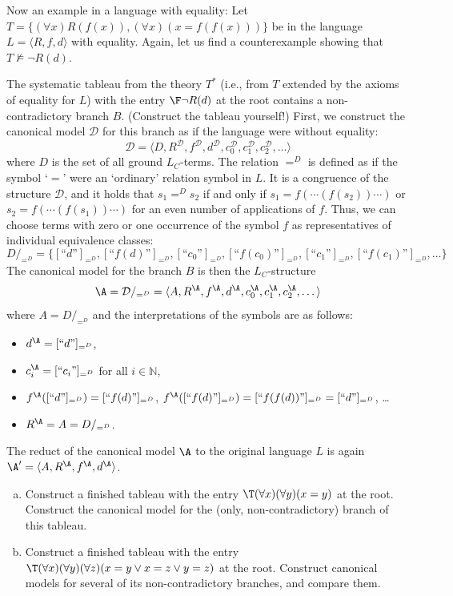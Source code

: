 \begin{example}
    Now an example in a language with equality: Let $T=\{(\forall x)R(f(x)),(\forall x)(x=f(f(x)))\}$ be in the language $L=\langle R,f,d \rangle$ with equality. Again, let us find a counterexample showing that $T\not\models\neg R(d)$. 

    The systematic tableau from the theory $T^*$ (i.e., from $T$ extended by the axioms of equality for $L$) with the entry $\F\neg R(d)$ at the root contains a non-contradictory branch $B$. (Construct the tableau yourself!) First, we construct the canonical model $\mathcal D$ for this branch as if the language were without equality:
    $$
    \mathcal D=\langle D,R^\mathcal D,f^\mathcal D,d^\mathcal D,c_0^\mathcal D,c_1^\mathcal D,c_2^\mathcal D,\dots\rangle
    $$
    where $D$ is the set of all ground $L_C$-terms. The relation $=^D$ is defined as if the symbol `$=$' were an `ordinary' relation symbol in $L$. It is a congruence of the structure $\mathcal D$, and it holds that $s_1=^D s_2$ if and only if $s_1=f(\cdots (f(s_2))\cdots)$ or $s_2=f(\cdots (f(s_1))\cdots)$ for an even number of applications of $f$. Thus, we can choose terms with zero or one occurrence of the symbol $f$ as representatives of individual equivalence classes:
    $$
        D/_{=^D} = \{[\text{``$d$''}]_{=^D},[\text{``$f(d)$''}]_{=^D},[\text{``$c_0$''}]_{=^D},[\text{``$f(c_0)$''}]_{=^D},[\text{``$c_1$''}]_{=^D},[\text{``$f(c_1)$''}]_{=^D},\dots\}
    $$
    The canonical model for the branch $B$ is then the $L_C$-structure 
    $$
    \A=\mathcal D/_{=^D}=\langle A,R^\A,f^\A,d^\A,c_0^\A,c_1^\A,c_2^\A,\dots\rangle
    $$
    where $A=D/_{=^D}$ and the interpretations of the symbols are as follows:
    \begin{itemize}
        \item $d^\A=[\text{``$d$''}]_{=^D}$,
        \item $c^\A_i=[\text{``$c_i$''}]_{=^D}$ for all $i\in \mathbb N$,
        \item $f^\A([\text{``$d$''}]_{=^D})=[\text{``$f(d)$''}]_{=^D}$, $f^\A([\text{``$f(d)$''}]_{=^D})=[\text{``$f(f(d))$''}]_{=^D}=[\text{``$d$''}]_{=^D}$, \dots
        \item $R^\A=A=D/_{=^D}$.
    \end{itemize}
    The reduct of the canonical model $\A$ to the original language $L$ is again $\A'=\langle A, R^\A, f^\A, d^\A\rangle$.
\end{example}

\begin{exercise}
    \begin{enumerate}[(a)]
        \item Construct a finished tableau with the entry $\T (\forall x)(\forall y)(x=y)$ at the root. Construct the canonical model for the (only, non-contradictory) branch of this tableau.
        \item Construct a finished tableau with the entry $\T (\forall x)(\forall y)(\forall z)(x=y\lor x=z \lor y=z)$ at the root. Construct canonical models for several of its non-contradictory branches, and compare them.
    \end{enumerate}
\end{exercise} 

